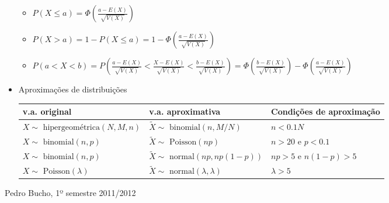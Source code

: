 \documentclass[a4paper]{report}
\begin{document}
\begin{itemize}
\begin{itemize}
				\item $P(X\leq a)=\Phi\left(\frac{a-E(X)}{\sqrt{V(X)}}\right)$
				\item $P(X>a)=1-P(X\leq a)=1-\Phi\left(\frac{a-E(X)}{\sqrt{V(X)}}\right)$
				\item $P(a<X<b)=P\left(\frac{a-E(X)}{\sqrt{V(X)}}<\frac{X-E(X)}{\sqrt{V(X)}}<\frac{b-E(X)}{\sqrt{V(X)}} \right)=\Phi\left(\frac{b-E(X)}{\sqrt{V(X)}}\right)-\Phi\left(\frac{a-E(X)}{\sqrt{V(X)}}\right)$
			\end{itemize}
			\item Aproximações de distribuições\\
			\begin{tabular}{lll}
				\hline
				v.a. original&v.a. aproximativa&Condições de aproximação\\\hline
				$X\sim\text{ hipergeométrica}(N,M,n)$&$\tilde X\sim\text{ binomial}(n,M/N)$&$n<0.1N$\\
				$X\sim\text{ binomial}(n,p)$&$\tilde X\sim\text{ Poisson}(np)$&$n>20$ e $p<0.1$\\
				$X\sim\text{ binomial}(n,p)$&$\tilde X\sim\text{ normal}(np,np(1-p))$&$np>5$ e $n(1-p)>5$\\
				$X\sim\text{ Poisson}(\lambda)$&$\tilde X\sim\text{ normal}(\lambda,\lambda)$&$\lambda>5$\\\hline
			\end{tabular}
		\end{itemize}
		\begin{flushright}
			Pedro Bucho, 1º semestre 2011/2012
		\end{flushright}
\end{document}
